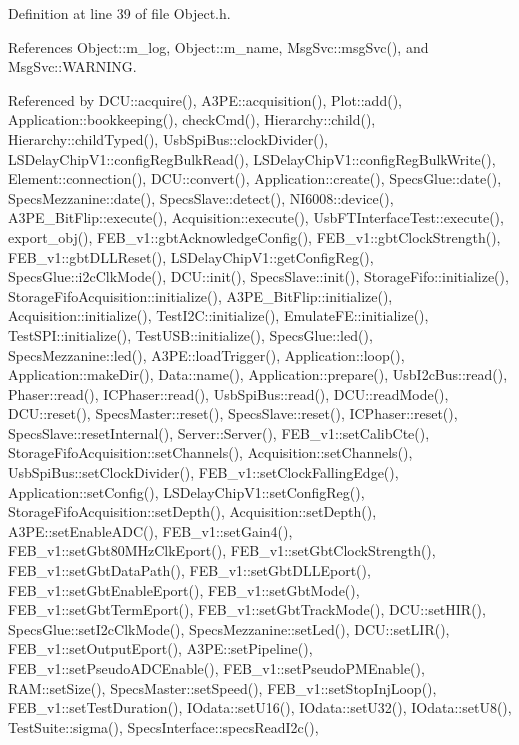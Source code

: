 Definition at line 39 of file Object.\+h.



References Object\+::m\+\_\+log, Object\+::m\+\_\+name, Msg\+Svc\+::msg\+Svc(), and Msg\+Svc\+::\+W\+A\+R\+N\+I\+NG.



Referenced by D\+C\+U\+::acquire(), A3\+P\+E\+::acquisition(), Plot\+::add(), Application\+::bookkeeping(), check\+Cmd(), Hierarchy\+::child(), Hierarchy\+::child\+Typed(), Usb\+Spi\+Bus\+::clock\+Divider(), L\+S\+Delay\+Chip\+V1\+::config\+Reg\+Bulk\+Read(), L\+S\+Delay\+Chip\+V1\+::config\+Reg\+Bulk\+Write(), Element\+::connection(), D\+C\+U\+::convert(), Application\+::create(), Specs\+Glue\+::date(), Specs\+Mezzanine\+::date(), Specs\+Slave\+::detect(), N\+I6008\+::device(), A3\+P\+E\+\_\+\+Bit\+Flip\+::execute(), Acquisition\+::execute(), Usb\+F\+T\+Interface\+Test\+::execute(), export\+\_\+obj(), F\+E\+B\+\_\+v1\+::gbt\+Acknowledge\+Config(), F\+E\+B\+\_\+v1\+::gbt\+Clock\+Strength(), F\+E\+B\+\_\+v1\+::gbt\+D\+L\+L\+Reset(), L\+S\+Delay\+Chip\+V1\+::get\+Config\+Reg(), Specs\+Glue\+::i2c\+Clk\+Mode(), D\+C\+U\+::init(), Specs\+Slave\+::init(), Storage\+Fifo\+::initialize(), Storage\+Fifo\+Acquisition\+::initialize(), A3\+P\+E\+\_\+\+Bit\+Flip\+::initialize(), Acquisition\+::initialize(), Test\+I2\+C\+::initialize(), Emulate\+F\+E\+::initialize(), Test\+S\+P\+I\+::initialize(), Test\+U\+S\+B\+::initialize(), Specs\+Glue\+::led(), Specs\+Mezzanine\+::led(), A3\+P\+E\+::load\+Trigger(), Application\+::loop(), Application\+::make\+Dir(), Data\+::name(), Application\+::prepare(), Usb\+I2c\+Bus\+::read(), Phaser\+::read(), I\+C\+Phaser\+::read(), Usb\+Spi\+Bus\+::read(), D\+C\+U\+::read\+Mode(), D\+C\+U\+::reset(), Specs\+Master\+::reset(), Specs\+Slave\+::reset(), I\+C\+Phaser\+::reset(), Specs\+Slave\+::reset\+Internal(), Server\+::\+Server(), F\+E\+B\+\_\+v1\+::set\+Calib\+Cte(), Storage\+Fifo\+Acquisition\+::set\+Channels(), Acquisition\+::set\+Channels(), Usb\+Spi\+Bus\+::set\+Clock\+Divider(), F\+E\+B\+\_\+v1\+::set\+Clock\+Falling\+Edge(), Application\+::set\+Config(), L\+S\+Delay\+Chip\+V1\+::set\+Config\+Reg(), Storage\+Fifo\+Acquisition\+::set\+Depth(), Acquisition\+::set\+Depth(), A3\+P\+E\+::set\+Enable\+A\+D\+C(), F\+E\+B\+\_\+v1\+::set\+Gain4(), F\+E\+B\+\_\+v1\+::set\+Gbt80\+M\+Hz\+Clk\+Eport(), F\+E\+B\+\_\+v1\+::set\+Gbt\+Clock\+Strength(), F\+E\+B\+\_\+v1\+::set\+Gbt\+Data\+Path(), F\+E\+B\+\_\+v1\+::set\+Gbt\+D\+L\+L\+Eport(), F\+E\+B\+\_\+v1\+::set\+Gbt\+Enable\+Eport(), F\+E\+B\+\_\+v1\+::set\+Gbt\+Mode(), F\+E\+B\+\_\+v1\+::set\+Gbt\+Term\+Eport(), F\+E\+B\+\_\+v1\+::set\+Gbt\+Track\+Mode(), D\+C\+U\+::set\+H\+I\+R(), Specs\+Glue\+::set\+I2c\+Clk\+Mode(), Specs\+Mezzanine\+::set\+Led(), D\+C\+U\+::set\+L\+I\+R(), F\+E\+B\+\_\+v1\+::set\+Output\+Eport(), A3\+P\+E\+::set\+Pipeline(), F\+E\+B\+\_\+v1\+::set\+Pseudo\+A\+D\+C\+Enable(), F\+E\+B\+\_\+v1\+::set\+Pseudo\+P\+M\+Enable(), R\+A\+M\+::set\+Size(), Specs\+Master\+::set\+Speed(), F\+E\+B\+\_\+v1\+::set\+Stop\+Inj\+Loop(), F\+E\+B\+\_\+v1\+::set\+Test\+Duration(), I\+Odata\+::set\+U16(), I\+Odata\+::set\+U32(), I\+Odata\+::set\+U8(), Test\+Suite\+::sigma(), Specs\+Interface\+::specs\+Read\+I2c(), 
